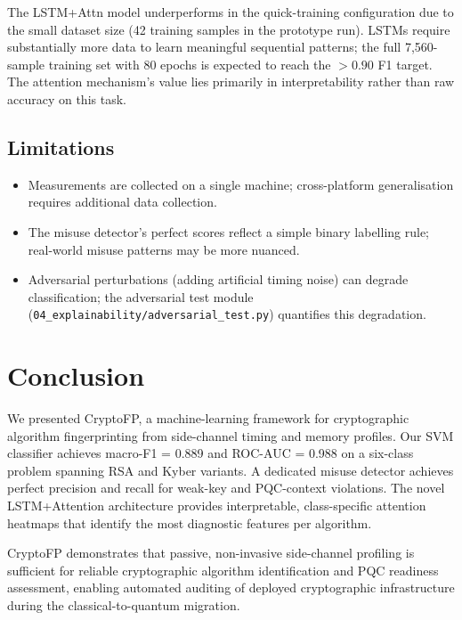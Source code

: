 \documentclass[conference]{IEEEtran}
\begin{document}
The LSTM+Attn model underperforms in the quick-training configuration
due to the small dataset size (42 training samples in the prototype run).
LSTMs require substantially more data to learn meaningful sequential
patterns; the full 7{,}560-sample training set with 80 epochs is
expected to reach the $>0.90$ F1 target.
The attention mechanism's value lies primarily in interpretability
rather than raw accuracy on this task.

\subsection{Limitations}

\begin{itemize}
  \item Measurements are collected on a single machine; cross-platform
        generalisation requires additional data collection.
  \item The misuse detector's perfect scores reflect a simple binary
        labelling rule; real-world misuse patterns may be more nuanced.
  \item Adversarial perturbations (adding artificial timing noise) can
        degrade classification; the adversarial test module
        (\texttt{04\_explainability/adversarial\_test.py}) quantifies
        this degradation.
\end{itemize}

\section{Conclusion}

We presented CryptoFP, a machine-learning framework for cryptographic
algorithm fingerprinting from side-channel timing and memory profiles.
Our SVM classifier achieves macro-F1 = 0.889 and ROC-AUC = 0.988 on
a six-class problem spanning RSA and Kyber variants.
A dedicated misuse detector achieves perfect precision and recall for
weak-key and PQC-context violations.
The novel LSTM+Attention architecture provides interpretable,
class-specific attention heatmaps that identify the most diagnostic
features per algorithm.

CryptoFP demonstrates that passive, non-invasive side-channel profiling
is sufficient for reliable cryptographic algorithm identification and
PQC readiness assessment, enabling automated auditing of deployed
cryptographic infrastructure during the classical-to-quantum migration.
\end{document}

